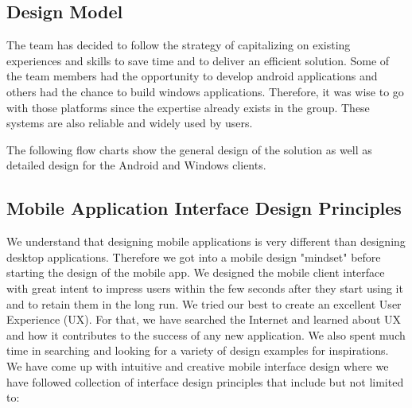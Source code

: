 \documentclass{article}
\begin{document}
\subsection{Design Model}
The team has decided to follow the strategy of capitalizing on existing experiences and skills to save time and to deliver an efficient solution. Some of the team members had the opportunity to develop android applications and others had the chance to build windows applications. Therefore, it was wise to go with those platforms since the expertise already exists in the group. These systems are also reliable and widely used by users.

The following flow charts show the general design of the solution as well as detailed design for the Android and Windows clients.


\subsection{Mobile Application Interface Design Principles}
We understand that designing mobile applications is very different than designing desktop applications. Therefore we got into a mobile design "mindset" before starting the design of the mobile app.
We designed the mobile client interface with great intent to impress users within the few seconds after they start using it and to retain them in the long run. We tried our best to create an excellent User Experience (UX). For that, we have searched the Internet and learned about UX and how it contributes to the success of any new application. We also spent much time in searching and looking for a variety of design examples for inspirations. We have come up with intuitive and creative mobile interface design where we have followed collection of interface design principles that include but not limited to:
\end{document}
